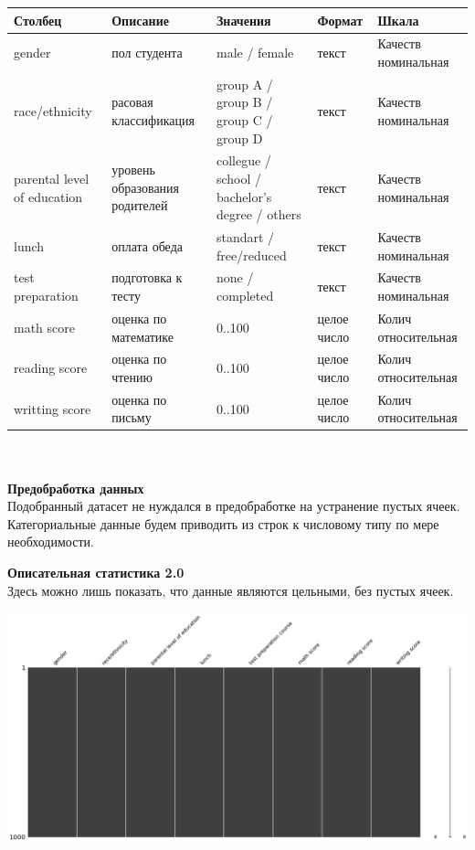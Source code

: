 \documentclass[12pt,a4paper]{article}
\begin{document}
\begin{tabular}{ | p{100pt} | p{100pt} | p{100pt} | p{40pt} | p{60pt} |}
\hline
Столбец & Описание & Значения & Формат & Шкала  \\ \hline
gender & пол студента & male / female & текст & Качеств номинальная \\ \hline
race/ethnicity & расовая классификация & group A / group B / group C / group D & текст & Качеств номинальная  \\ \hline
parental level of education & уровень образования родителей & collegue / school / bachelor's degree / others  & текст & Качеств номинальная  \\ \hline
lunch & оплата обеда & standart / free/reduced & текст & Качеств номинальная  \\ \hline
test preparation & подготовка к тесту & none / completed & текст & Качеств номинальная  \\ \hline
math score & оценка по математике & 0..100 & целое число & Колич относительная  \\ \hline
reading score & оценка по чтению & 0..100 & целое число & Колич относительная  \\ \hline
writting score & оценка по письму & 0..100 & целое число & Колич относительная  \\ \hline
\end{tabular}
\\
\\

\textbf{Предобработка данных}
\\ 
Подобранный датасет не нуждался в предобработке на устранение пустых ячеек. Категориальные данные будем приводить из строк к числовому типу по мере необходимости.

\newpage

\textbf{Описательная статистика 2.0} \\

Здесь можно лишь показать, что данные являются цельными, без пустых ячеек.

\includegraphics[scale=0.3]{msno_matrix} \\
\end{document}

